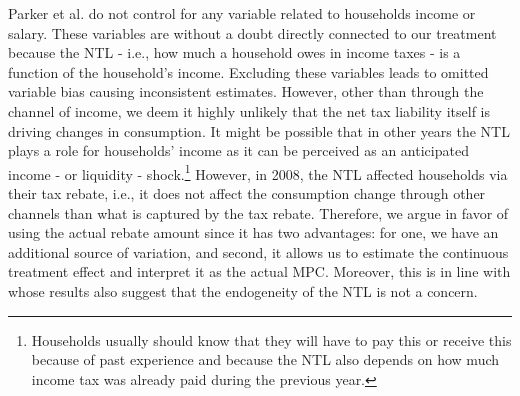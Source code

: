 Parker et al. do not control for any variable related to households income or salary. These variables are without a doubt directly connected to our treatment because the NTL - i.e., how much a household owes in income taxes - is a function of the household's income. Excluding these variables leads to omitted variable bias causing inconsistent estimates. However, other than through the channel of income, we deem it highly unlikely that the net tax liability itself is driving changes in consumption. It might be possible that in other years the NTL plays a role for households' income as it can be perceived as an anticipated income - or liquidity - shock.\footnote{Households usually should know that they will have to pay this or receive this because of past experience and because the NTL also depends on how much income tax was already paid during the previous year.} However, in 2008, the NTL affected households via their tax rebate, i.e., it does not affect the consumption change through other channels than what is captured by the tax rebate. Therefore, we argue in favor of using the actual rebate amount since it has two advantages: for one, we have an additional source of variation, and second, it allows us to estimate the continuous treatment effect and interpret it as the actual MPC. Moreover, this is in line with \cite{misrasurico_2014} whose results also suggest that the endogeneity of the NTL is not a concern.


